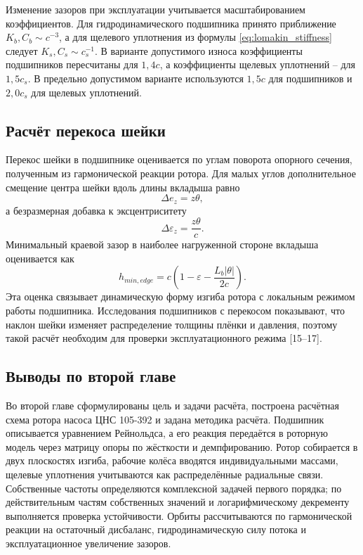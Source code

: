 \documentclass[14pt,a4paper]{extarticle}
\numberwithin{equation}{section}
\numberwithin{figure}{section}
\numberwithin{table}{section}
\begin{document}
Изменение зазоров при эксплуатации учитывается масштабированием коэффициентов. Для гидродинамического подшипника принято приближение $K_b,C_b\sim c^{-3}$, а для щелевого уплотнения из формулы \eqref{eq:lomakin_stiffness} следует $K_s,C_s\sim c_s^{-1}$. В варианте допустимого износа коэффициенты подшипников пересчитаны для $1{,}4c$, а коэффициенты щелевых уплотнений -- для $1{,}5c_s$. В предельно допустимом варианте используются $1{,}5c$ для подшипников и $2{,}0c_s$ для щелевых уплотнений.

\subsection{Расчёт перекоса шейки}

Перекос шейки в подшипнике оценивается по углам поворота опорного сечения, полученным из гармонической реакции ротора. Для малых углов дополнительное смещение центра шейки вдоль длины вкладыша равно
\begin{equation}
    \Delta e_z=z\theta,
\end{equation}
а безразмерная добавка к эксцентриситету
\begin{equation}
    \Delta\varepsilon_z=\frac{z\theta}{c}.
\end{equation}
Минимальный краевой зазор в наиболее нагруженной стороне вкладыша оценивается как
\begin{equation}
    h_{min,edge}=c\left(1-\varepsilon-\frac{L_b|\theta|}{2c}\right).
    \label{eq:edge_clearance}
\end{equation}
Эта оценка связывает динамическую форму изгиба ротора с локальным режимом работы подшипника. Исследования подшипников с перекосом показывают, что наклон шейки изменяет распределение толщины плёнки и давления, поэтому такой расчёт необходим для проверки эксплуатационного режима [15--17].

\subsection{Выводы по второй главе}

Во второй главе сформулированы цель и задачи расчёта, построена расчётная схема ротора насоса ЦНС 105-392 и задана методика расчёта. Подшипник описывается уравнением Рейнольдса, а его реакция передаётся в роторную модель через матрицу опоры по жёсткости и демпфированию. Ротор собирается в двух плоскостях изгиба, рабочие колёса вводятся индивидуальными массами, щелевые уплотнения учитываются как распределённые радиальные связи. Собственные частоты определяются комплексной задачей первого порядка; по действительным частям собственных значений и логарифмическому декременту выполняется проверка устойчивости. Орбиты рассчитываются по гармонической реакции на остаточный дисбаланс, гидродинамическую силу потока и эксплуатационное увеличение зазоров.
\end{document}
